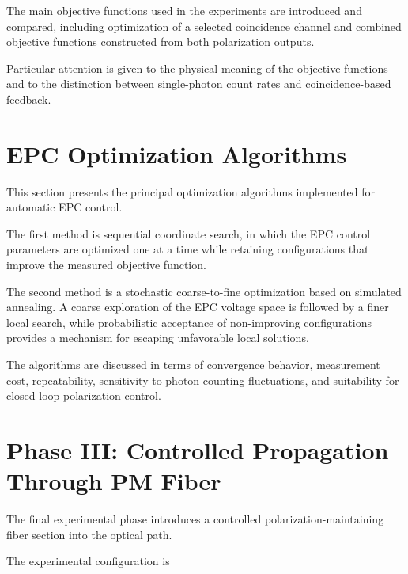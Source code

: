 The main objective functions used in the experiments are introduced and compared,
including optimization of a selected coincidence channel and combined objective
functions constructed from both polarization outputs.

Particular attention is given to the physical meaning of the objective functions
and to the distinction between single-photon count rates and coincidence-based
feedback.



\section{EPC Optimization Algorithms}
\label{sec:epc_optimization_algorithms}

This section presents the principal optimization algorithms implemented for
automatic EPC control.

The first method is sequential coordinate search, in which the EPC control
parameters are optimized one at a time while retaining configurations that
improve the measured objective function.

The second method is a stochastic coarse-to-fine optimization based on simulated
annealing. A coarse exploration of the EPC voltage space is followed by a finer
local search, while probabilistic acceptance of non-improving configurations
provides a mechanism for escaping unfavorable local solutions.

The algorithms are discussed in terms of convergence behavior, measurement cost,
repeatability, sensitivity to photon-counting fluctuations, and suitability for
closed-loop polarization control.



\section{Phase III: Controlled Propagation Through PM Fiber}
\label{sec:phase3_pm_fiber}

The final experimental phase introduces a controlled polarization-maintaining
fiber section into the optical path.

The experimental configuration is

